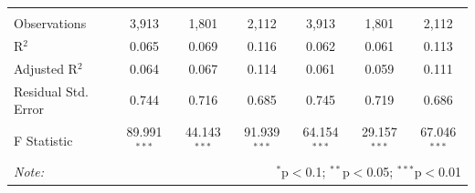 \documentclass[alpha-refs]{wiley-article-01g}
\begin{document}
\begin{landscape}
\begin{table}[!htbp]
\begin{tabular}{@{\extracolsep{5pt}}lcccccc}
			& & & & & & \\ 
			\hline \\[-.8ex] 
			Observations & 3,913 & 1,801 & 2,112 & 3,913 & 1,801 & 2,112 \\ 
			R$^{2}$ & 0.065 & 0.069 & 0.116 & 0.062 & 0.061 & 0.113 \\ 
			Adjusted R$^{2}$ & 0.064 & 0.067 & 0.114 & 0.061 & 0.059 & 0.111 \\ 
			Residual Std. Error & 0.744 & 0.716 & 0.685 & 0.745 & 0.719 & 0.686 \\ 
			F Statistic & 89.991$^{***}$ & 44.143$^{***}$ & 91.939$^{***}$ & 64.154$^{***}$ & 29.157$^{***}$ & 67.046$^{***}$ \\ 
			\hline 
			\textit{Note:}  & \multicolumn{6}{r}{$^{*}$p$<$0.1; $^{**}$p$<$0.05; $^{***}$p$<$0.01} \\ 
		\end{tabular} 
	\end{table} 
	
\end{landscape}

\newpage
\end{document}
